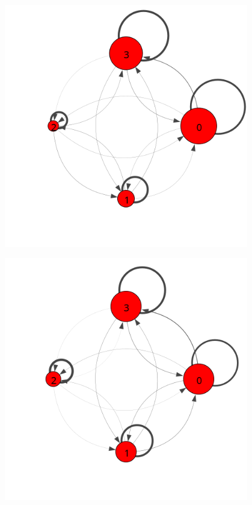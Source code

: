 \begin{marginfigure}
  \centering
  \begin{subfigure}[t]{\textwidth}
    \includegraphics[width=0.95\textwidth,trim={0 3cm 0 2cm}]{../figures/trans-comp/trans-avg.png}
    \caption{\vspace{20pt}\label{fig:trans-avg}}
  \end{subfigure}

  \begin{subfigure}[t]{\textwidth}
    \includegraphics[width=0.95\textwidth,trim={0, 3cm 0 2cm}]{../figures/trans-comp/trans-perfect.png}
    \caption{\vspace{20pt}\label{fig:trans-perfect}}
  \end{subfigure}


\end{marginfigure}
